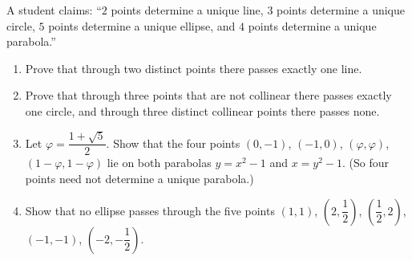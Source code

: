 A student claims: ``$2$ points determine a unique line, $3$ points determine a unique circle, $5$ points determine a unique ellipse, and $4$ points determine a unique parabola.''
\begin{enumerate}
\item[(a)] Prove that through two distinct points there passes exactly one line.
\item[(b)] Prove that through three points that are not collinear there passes exactly one circle, and through three distinct collinear points there passes none.
\item[(c)] Let $\varphi=\dfrac{1+\sqrt5}{2}$. Show that the four points $(0,-1)$, $(-1,0)$, $(\varphi,\varphi)$, $(1-\varphi,1-\varphi)$ lie on both parabolas $y=x^2-1$ and $x=y^2-1$. (So four points need not determine a unique parabola.)
\item[(d)] Show that no ellipse passes through the five points $(1,1)$, $\left(2,\dfrac12\right)$, $\left(\dfrac12,2\right)$, $(-1,-1)$, $\left(-2,-\dfrac12\right)$.
\end{enumerate}
